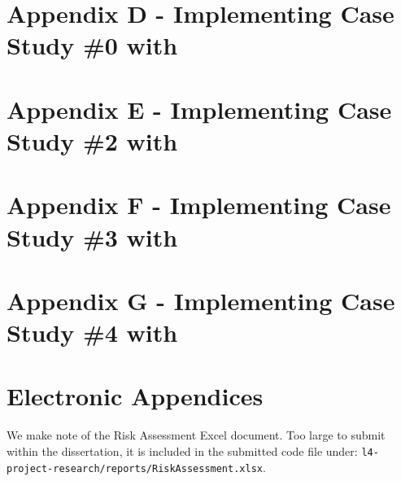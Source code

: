 \begin{appendices}
\begin{figure}
\end{figure}

\section{Appendix D - Implementing Case Study \#0 with \thePolicyLang}
\label{appendix:case_study_0_policy}



\section{Appendix E - Implementing Case Study \#2 with \thePolicyLang}
\label{appendix:case_study_2_policy}



\section{Appendix F - Implementing Case Study \#3 with \thePolicyLang}
\label{appendix:case_study_3_policy}



\section{Appendix G - Implementing Case Study \#4 with \thePolicyLang}
\label{appendix:case_study_4_policy}



\section{Electronic Appendices}
\label{appendix:electronic_appendices}

We make note of the Risk Assessment Excel document. Too large to submit within the dissertation, it is included in the submitted code file under: \texttt{l4-project-research/reports/RiskAssessment.xlsx}.

\end{appendices}
